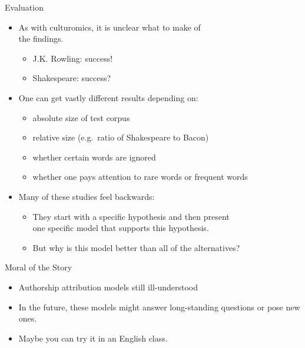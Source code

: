 \documentclass[professionalfonts, xcolor={usenames,svgnames,x11names,table}]{beamer}
\begin{document}
\begin{frame}{Evaluation}
    \begin{itemize}
        \item As with culturomics, it is unclear what to make of\\
            the findings.
            \begin{itemize}
                \item J.K. Rowling: success!
                \item Shakespeare: success?
            \end{itemize}
        \item One can get vastly different results depending on:
            \begin{itemize}
                \item absolute size of test corpus
                \item relative size (e.g.\ ratio of Shakespeare to Bacon)
                \item whether certain words are ignored
                \item whether one pays attention to rare words or frequent words
            \end{itemize}
        \item Many of these studies feel backwards:
            \begin{itemize}
                \item They start with a specific hypothesis and then present\\
                    one specific model that supports this hypothesis.
                \item But why is this model better than all of the alternatives?
            \end{itemize}
    \end{itemize}
\end{frame}

\begin{frame}{Moral of the Story}
    \begin{itemize}
        \item Authorship attribution models still ill-understood
        \item In the future, these models might answer long-standing questions or pose new ones.
        \item Maybe you can try it in an English class.
    \end{itemize}
\end{frame}
\end{document}
